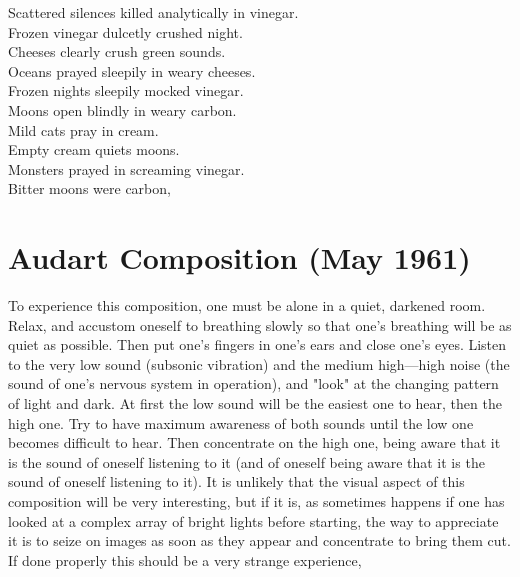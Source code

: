 Scattered silences killed analytically in vinegar.\\
Frozen vinegar dulcetly crushed night. \\
Cheeses clearly crush green sounds. \\
Oceans prayed sleepily in weary cheeses.\\
Frozen nights sleepily mocked vinegar.\\
Moons open blindly in weary carbon.\\
Mild cats pray in cream.\\
Empty cream quiets moons.\\
Monsters prayed in screaming vinegar.\\
Bitter moons were carbon,\\

\clearpage
\section[Audart Composition (May 1961)][Audart Composition]{Audart Composition (May 1961)}

To experience this composition, one must be alone in a
quiet, darkened room. Relax, and accustom oneself to breathing
slowly so that one's breathing will be as quiet as possible.
Then put one's fingers in one's ears and close one's eyes.
Listen to the very low sound (subsonic vibration) and the medium
high---high noise (the sound of one's nervous system in operation),
and "look" at the changing pattern of light and dark.
At first the low sound will be the easiest one to hear, then
the high one. Try to have maximum awareness of both sounds
until the low one becomes difficult to hear. Then concentrate
on the high one, being aware that it is the sound of oneself
listening to it (and of oneself being aware that it is the 
sound of oneself listening to it). It is unlikely that the
visual aspect of this composition will be very interesting,
but if it is, as sometimes happens if one has looked at a complex
array of bright lights before starting, the way to appreciate 
it is to seize on images as soon as they appear and concentrate
to bring them cut. If done properly this should be a very strange experience, 

\clearpage
